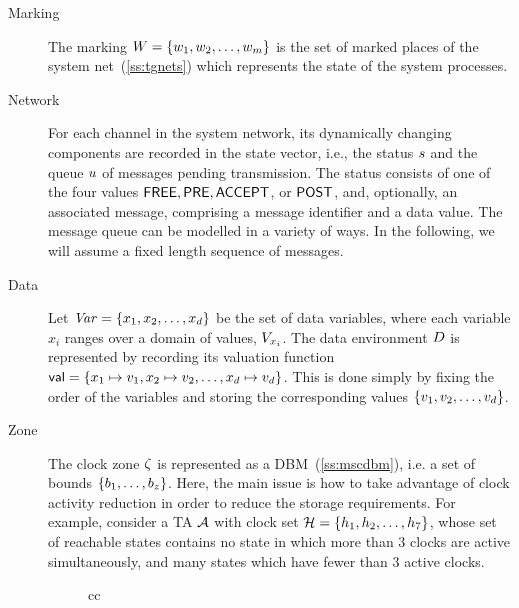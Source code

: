 \begin{description}
\item[Marking] The marking $\W = \{\ww_1,\ww_2,\ldots,\ww_m\}$ is the set of
marked places of the system net~(\Sec\ref{ss:tgnets}) which represents the
state of the system processes. 
\item[Network] For each channel in the system network, its
dynamically changing components are recorded in the state vector, i.e., 
the status $\ss$ and the queue $\mq$ of messages pending transmission. 
The status
consists of one of the four values $\FREE, \PRE, \ACCEPT$, or $\POST$,
and, optionally, an associated message, comprising a message
identifier and a data value. The message queue can be modelled in a variety
of ways. In the following, we will assume a fixed length sequence of messages.
\item[Data] Let $\Var = \{\xx_1,\xx_2,\ldots,\xx_d\}$ be the set of data
variables, where each variable $x_i$ ranges over a domain of values,
$\V_{\xx_i}$. The
data environment $\D$ is represented by recording its valuation
function $\val = \{\xx_1 \mapsto \vv_1, \xx_2 \mapsto \vv_2,\ldots,\xx_d \mapsto \vv_d\}$. This is done simply by fixing the 
order of the variables and storing the corresponding values 
$\{\vv_1,\vv_2,\ldots,\vv_d\}$. 
\item[Zone] 
The clock zone $\vexcond$ is represented as a
DBM~(\Sec\ref{ss:mscdbm}), i.e. a set of bounds $\{\bb_1,\ldots,\bb_z\}$. 
Here, the main issue is how to take advantage
of clock activity reduction in order to reduce the storage
requirements.  For example, consider a TA $\AA$ with clock set
$\clocks = \{\clock_1,\clock_2, \ldots, \clock_7\}$, whose set of
reachable states contains no state in which more than 3 clocks are
active simultaneously, and many states which have fewer than 3
active clocks.
\begin{figure}
\begin{center}
\begin{tabular}{cc}
\end{tabular}
\end{center}
\end{figure}
\end{description}
